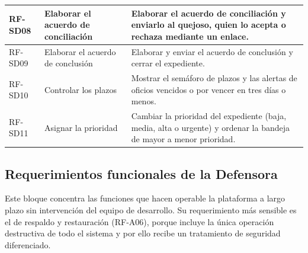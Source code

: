 \begin{longtable}{|p{1.5cm}|p{3.6cm}|p{9.0cm}|}
		RF-SD08 & Elaborar el acuerdo de conciliación & Elaborar el acuerdo de conciliación y enviarlo
		al quejoso, quien lo acepta o rechaza mediante un enlace. \\ \hline

		RF-SD09 & Elaborar el acuerdo de conclusión & Elaborar y enviar el acuerdo de conclusión y
		cerrar el expediente. \\ \hline

		RF-SD10 & Controlar los plazos & Mostrar el semáforo de plazos y las alertas de oficios
		vencidos o por vencer en tres días o menos. \\ \hline

		RF-SD11 & Asignar la prioridad & Cambiar la prioridad del expediente (baja, media, alta o
		urgente) y ordenar la bandeja de mayor a menor prioridad. \\ \hline
	\end{longtable}

	\normalsize

	\subsection{Requerimientos funcionales de la Defensora}
	Este bloque concentra las funciones que hacen operable la plataforma a largo plazo sin
	intervención del equipo de desarrollo. Su requerimiento más sensible es el de respaldo y
	restauración (RF-A06), porque incluye la única operación destructiva de todo el sistema y por
	ello recibe un tratamiento de seguridad diferenciado.
	
	\small
	\renewcommand{\arraystretch}{1.2}
	
